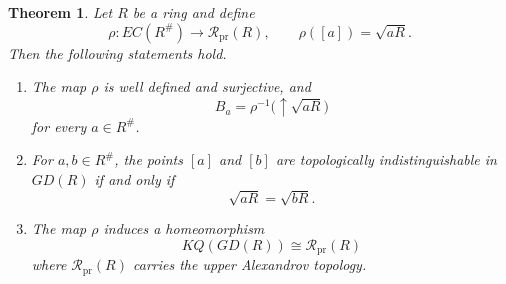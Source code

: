 \documentclass[11pt]{amsart}
\theoremstyle{plain}
\newtheorem{theorem}{Theorem}[section]
\theoremstyle{definition}
\theoremstyle{remark}
\numberwithin{equation}{section}
\begin{document}
\begin{theorem}\label{thm:KQ}
	Let $R$ be a ring and define
	\[
	\rho:EC(R^\#)\longrightarrow\mathcal R_{\mathrm{pr}}(R),
	\qquad
	\rho([a])=\sqrt{aR}.
	\]
	Then the following statements hold.
	\begin{enumerate}
		\item The map $\rho$ is well defined and surjective, and
		\[
		B_a=\rho^{-1}\bigl(\uparrow\sqrt{aR}\bigr)
		\]
		for every $a\in R^\#$.
		\item For $a,b\in R^\#$, the points $[a]$ and $[b]$ are topologically
		indistinguishable in $GD(R)$ if and only if
		\[
		\sqrt{aR}=\sqrt{bR}.
		\]
		\item The map $\rho$ induces a homeomorphism
		\[
		KQ(GD(R))
		\cong
		\mathcal R_{\mathrm{pr}}(R)
		\]
		where $\mathcal R_{\mathrm{pr}}(R)$ carries the upper Alexandrov topology.
	\end{enumerate}
\end{theorem}
\end{document}
